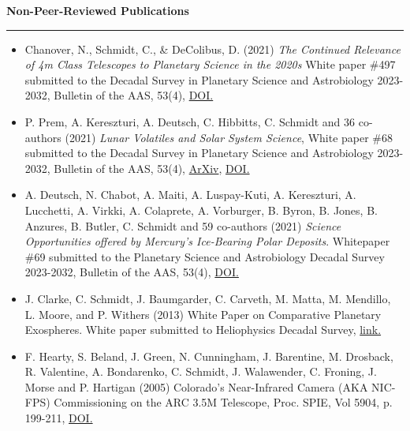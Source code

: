 \documentclass[12pt]{report}
\begin{document}
\vspace{2 mm}
\noindent\bf{Non-Peer-Reviewed Publications}\rm \hspace*{\fill} \\
\rule{\textwidth}{1pt}
 \begin{itemize} \itemsep -2pt %
  \item Chanover, N., Schmidt, C., \& DeColibus, D. (2021) \textit{ The Continued Relevance of 4m Class Telescopes to Planetary Science in the 2020s} White paper \#497 submitted to the Decadal Survey in Planetary Science and Astrobiology 2023-2032, Bulletin of the AAS, 53(4), \href{https://doi.org/10.3847/25c2cfeb.752e4fa4}{DOI.}
  \item P. Prem, A. Kereszturi, A. Deutsch, C. Hibbitts, C. Schmidt and 36 co-authors (2021) \textit{Lunar Volatiles and Solar System Science}, White paper \#68 submitted to the Decadal Survey in Planetary Science and Astrobiology 2023-2032, Bulletin of the AAS, 53(4), \href{https://arxiv.org/ftp/arxiv/papers/2012/2012.06317.pdf}{ArXiv}, \href{https://doi.org/10.3847/25c2cfeb.f62324b8}{DOI.}
  \item A. Deutsch, N. Chabot, A. Maiti, A. Luspay-Kuti, A. Kereszturi, A. Lucchetti, A. Virkki, A. Colaprete, A. Vorburger, B. Byron, B. Jones, B. Anzures, B. Butler, C. Schmidt and 59 co-authors (2021) \textit{Science Opportunities offered by Mercury’s Ice-Bearing Polar Deposits}. Whitepaper \#69 submitted to the Planetary Science and Astrobiology Decadal Survey 2023-2032, Bulletin of the AAS, 53(4), \href{https://doi.org/10.3847/25c2cfeb.98885a8e8}{DOI.} 
  \item J. Clarke, C. Schmidt, J. Baumgarder, C. Carveth, M. Matta, M. Mendillo, L. Moore, and P. Withers (2013) White Paper on Comparative Planetary Exospheres. White paper submitted to Heliophysics Decadal Survey, \href{http://sirius.bu.edu/withers/pppp/pdf/clarkeheiodswp2010.pdf}{link.}
  \item F. Hearty, S. Beland, J. Green, N. Cunningham, J. Barentine, M. Drosback, R. Valentine, A. Bondarenko, C. Schmidt, J. Walawender, C. Froning, J. Morse and P. Hartigan (2005) Colorado's Near-Infrared Camera (AKA NIC-FPS) Commissioning on the ARC 3.5M Telescope, Proc. SPIE, Vol 5904, p. 199-211, \href{https://doi.org/10.1117/12.617593}{DOI.}
  \end{itemize}
\end{document}
